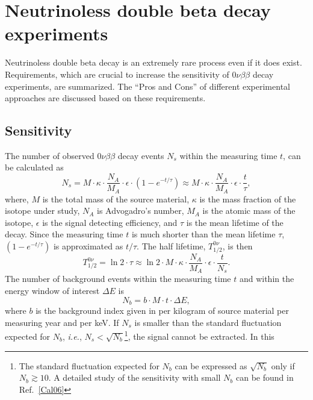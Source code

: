 \chapter{Neutrinoless double beta decay experiments}
\label{cha:exps}
Neutrinoless double beta decay is an extremely rare process even if it
does exist. Requirements, which are crucial to increase the
sensitivity of $0\nu\beta\beta$ decay experiments, are summarized. The
``Pros and Cons'' of different experimental approaches are discussed
based on these requirements.

\section{Sensitivity}
\label{sec:sensi}
The number of observed $0\nu\beta\beta$ decay events $N_{s}$ within
the measuring time $t$, can be calculated as
\begin{equation}
\label{eq:gerda:ns}
N_{s} = M \cdot \kappa \cdot \frac{N_{A}}{M_{A}} \cdot \epsilon 
\cdot (1 - e^{-t/\tau}) \approx M \cdot \kappa \cdot 
\frac{N_{A}}{M_{A}} \cdot \epsilon \cdot \frac{t}{\tau},
\end{equation}
where, $M$ is the total mass of the source material, $\kappa$ is the
mass fraction of the isotope under study, $N_{A}$ is Advogadro's
number, $M_{A}$ is the atomic mass of the isotope, $\epsilon$ is the
signal detecting efficiency, and $\tau$ is the mean lifetime of the
decay. Since the measuring time $t$ is much shorter than the mean
lifetime $\tau$, $(1 - e^{-t/\tau})$ is approximated as $t/\tau$. The
half lifetime, $T^{0\nu}_{1/2}$, is then
\begin{equation}
\label{eq:gerda:thalf}
T^{0\nu}_{1/2} = \ln2 \cdot \tau \approx \ln2 \cdot M \cdot \kappa 
\cdot \frac{N_{A}}{M_{A}} \cdot \epsilon \cdot \frac{t}{N_{s}}.
\end{equation}
The number of background events within the measuring time $t$ and
within the energy window of interest $\Delta E$ is
\begin{equation}
  \label{eq:gerda:nb}
  N_{b} = b \cdot M \cdot t \cdot \Delta E,
\end{equation}
where $b$ is the background index given in per kilogram of source
material per measuring year and per keV. If $N_{s}$ is smaller than
the standard fluctuation expected for $N_{b}$, \textit{i.e.},
$N_{s}<\sqrt{N_{b}}$\footnote{The standard fluctuation expected for
$N_{b}$ can be expressed as $\sqrt{N_{b}}$ only if $N_{b} \gtrsim
10$. A detailed study of the sensitivity with small $N_{b}$ can be
found in Ref.~\ref{Cal06}}, the signal cannot be extracted. In this
